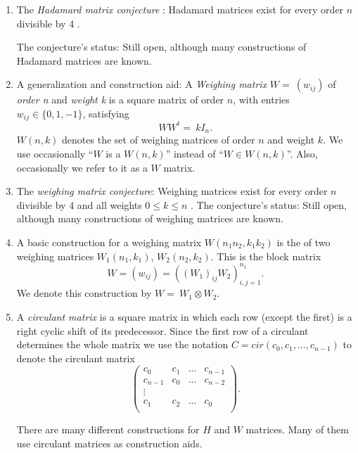{\begin{enumerate}
     \item The {\it Hadamard matrix conjecture} : Hadamard matrices exist for every order $ n $ divisible by 4 \cite{sw75}. 
     
	 The conjecture's status: Still open, although many constructions 
	   of Hadamard matrices are known.
     
	 \item A generalization and construction aid: A {\it Weighing matrix} \- 
	   $ W=~(w_{ij}) $ of {\it order n } and {\it weight k}  is a square 
	   matrix of order $ n $, with entries \- $ w_{ij} \in \{0,1,-1\} $, 
	   satisfying  $$WW^t=~kI_{n}.$$ 
	   $ W(n,k) $ denotes the set of 
	   weighing matrices of order $ n $ and weight $ k $. 
	   We use occasionally ``$ W $ is a $ W(n,k) $'' instead of \- 
	   ``$ W \in W(n,k) $''. \- Also, 
	   occasionally we refer to it as a $ W $ matrix.
     
     \item The {\it weighing matrix conjecture}: Weighing matrices exist for every order $ n $ divisible by 4 and all weights $ 0\leq k \leq n $ \cite{sy92}.
	    The conjecture's status: Still open, although many constructions 
	   of weighing matrices are known.
   
     
     \item A basic construction for a weighing matrix $ W(n_{1}n_{2},k_{1}k_{2}) $ is the  
	   of two weighing matrices $ W_{1}(n_{1},k_{1})$, $W_{2}(n_{2},k_{2}) $. 
	   This is the block matrix 
	   $$ W=(w_{ij})=((W_{1})_{ij}W_{2})^{n_{1}}_{i,j=1} .$$
	   We denote this construction by \-$ W=~W_{1} \otimes W_{2} $.   
     
     \item A {\it circulant matrix } is a square matrix in which each row 
	(except the first) is a right cyclic shift of its predecessor. Since 
	the first row of a circulant determines the whole matrix we use 
	the notation $ C=cir(c_{0},c_{1},...,c_{n-1}) $ to denote the 
	circulant matrix 
	  \[ \left( \begin{array}{cccc}
	c_{0}   & c_{1} & \ldots & c_{n-1} \\
	c_{n-1} & c_{0} & \ldots & c_{n-2} \\
	\vdots  \\
	c_{1}   & c_{2} & \ldots & c_{0} \\
	       \end{array}      \right).   \]
	
	 There are many different constructions for $ H $ and $ W $ matrices. Many of them use circulant matrices as construction aids.              
     

\end{enumerate}}
